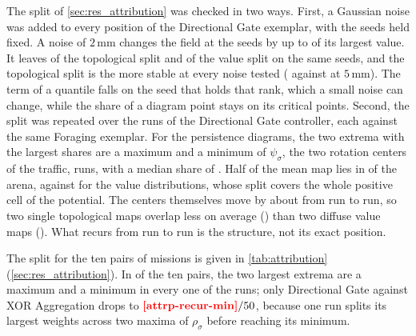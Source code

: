The split of \cref{sec:res_attribution} was checked in two ways. First, a Gaussian noise was added to every
position of the Directional Gate exemplar, with the seeds held fixed. A noise of $2$\,mm changes the field at the
seeds by up to  of its largest value. It leaves  of the topological
split and  of the value split on the same seeds, and the topological split is the more stable at
every noise tested ( against  at $5$\,mm). The term of a quantile falls on
the seed that holds that rank, which a small noise can change, while the share of a diagram point stays on its
critical points. Second, the split was repeated over the  runs of the Directional Gate controller,
each against the same Foraging exemplar. For the persistence diagrams, the two extrema with the largest shares are
a maximum and a minimum of $\psi_\sigma$, the two rotation centers of the traffic, 
 runs, with a median share of . Half of the mean map lies in
 of the arena, against  for the value distributions, whose split
covers the whole positive cell of the potential. The centers themselves move by about  from
run to run, so two single topological maps overlap less on average () than two diffuse value
maps (). What recurs from run to run is the structure, not its exact position.

The split for the ten pairs of missions is given in \cref{tab:attribution} (\cref{sec:res_attribution}). In
 of the ten pairs, the two largest extrema are a maximum and a minimum in every one of the
 runs; only Directional Gate against XOR Aggregation drops to $\nm{attrp-recur-min}/50$, because one run
splits its largest weights across two maxima of $\rho_\sigma$ before reaching its minimum.

